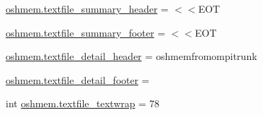 \begin{DoxyCompactItemize}
\item 
\hyperlink{namespaceoshmem_a145ad9a14eac762c5d8f46b444299ef9}{oshmem.\-textfile\-\_\-summary\-\_\-header} = $<$$<$E\-O\-T
\item 
\hyperlink{namespaceoshmem_a8aad4aa9999524970a03dbaac95ee861}{oshmem.\-textfile\-\_\-summary\-\_\-footer} = $<$$<$E\-O\-T
\item 
\hyperlink{namespaceoshmem_ae5a0095596c3624c7f19ae771452c5d3}{oshmem.\-textfile\-\_\-detail\-\_\-header} = oshmemfromompitrunk
\item 
\hyperlink{namespaceoshmem_aec7f6285615e309f4d179fde03e40d8e}{oshmem.\-textfile\-\_\-detail\-\_\-footer} =
\item 
int \hyperlink{namespaceoshmem_ab50c730a64d291ffba94c5a3258e7e2d}{oshmem.\-textfile\-\_\-textwrap} = 78
\end{DoxyCompactItemize}
